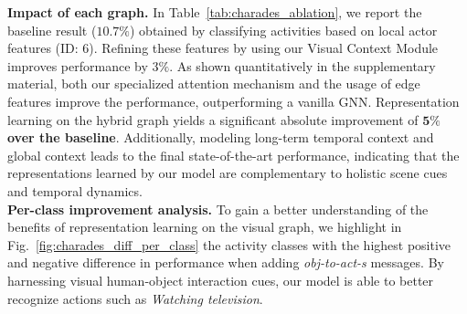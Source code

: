 \documentclass[runningheads]{llncs}
\begin{document}
\begin{table}[ht]
\caption{\textbf{Ablation analysis on Charades~\cite{Sigurdsson:ECCV16}}. \emph{Visual}: Visual Context Module. \emph{Semantic}: Semantic Context Module. \emph{Long Term}: long-term temporal modeling.}
\centering
{}
\label{tab:charades_ablation}
\end{table}
\noindent\textbf{Impact of each graph.} In Table~\ref{tab:charades_ablation}, we report the baseline result  ($10.7\%$) obtained by classifying activities based on local actor features (ID: 6). Refining these features by using our Visual Context Module improves performance by $3\%$. As shown quantitatively in the supplementary material,  both our specialized attention mechanism and the usage of edge features improve the performance, outperforming a vanilla GNN. Representation learning on the hybrid graph yields a significant absolute improvement of \textbf{$\mathbf{5\%}$ over the baseline}. Additionally, modeling long-term temporal context and global context leads to the final state-of-the-art performance, indicating that the representations learned by our model are complementary to holistic scene cues and temporal dynamics.\\
\textbf{Per-class improvement analysis.}
To gain a better understanding of the benefits of representation learning on the visual graph,  we highlight in Fig.~\ref{fig:charades_diff_per_class} the activity classes with the highest positive and negative difference in performance when adding \emph{obj-to-act-s} messages. By harnessing visual human-object interaction cues, our model is able to better recognize actions such as \emph{Watching television}. \\
\end{document}
